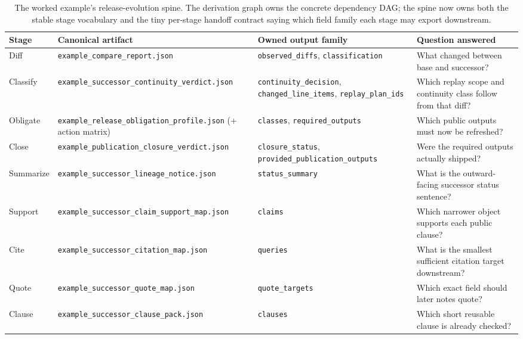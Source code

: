 \documentclass[11pt]{article}
\begin{document}
\begin{table}[t]
\centering
\small
\begin{tabularx}{\linewidth}{@{}l l l X@{}}
\toprule
Stage & Canonical artifact & Owned output family & Question answered \\
\midrule
Diff & \texttt{example\_compare\_report.json} & \texttt{observed\_diffs}, \texttt{classification} & What changed between base and successor? \\
Classify & \texttt{example\_successor\_continuity\_verdict.json} & \texttt{continuity\_decision}, \texttt{changed\_line\_items}, \texttt{replay\_plan\_ids} & Which replay scope and continuity class follow from that diff? \\
Obligate & \texttt{example\_release\_obligation\_profile.json} (+ action matrix) & \texttt{classes}, \texttt{required\_outputs} & Which public outputs must now be refreshed? \\
Close & \texttt{example\_publication\_closure\_verdict.json} & \texttt{closure\_status}, \texttt{provided\_publication\_outputs} & Were the required outputs actually shipped? \\
Summarize & \texttt{example\_successor\_lineage\_notice.json} & \texttt{status\_summary} & What is the outward-facing successor status sentence? \\
Support & \texttt{example\_successor\_claim\_support\_map.json} & \texttt{claims} & Which narrower object supports each public clause? \\
Cite & \texttt{example\_successor\_citation\_map.json} & \texttt{queries} & What is the smallest sufficient citation target downstream? \\
Quote & \texttt{example\_successor\_quote\_map.json} & \texttt{quote\_targets} & Which exact field should later notes quote? \\
Clause & \texttt{example\_successor\_clause\_pack.json} & \texttt{clauses} & Which short reusable clause is already checked? \\
\bottomrule
\end{tabularx}
\caption{The worked example's release-evolution spine. The derivation graph owns the concrete dependency DAG; the spine now owns both the stable stage vocabulary and the tiny per-stage handoff contract saying which field family each stage may export downstream.}
\label{tab:release-spine}
\end{table}
\end{document}
